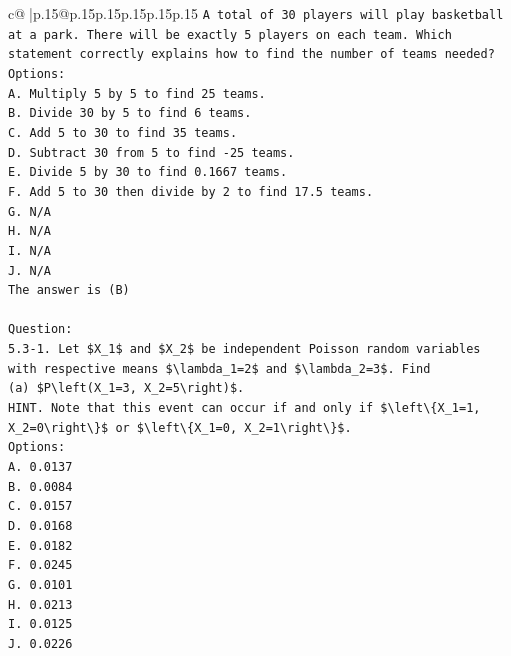 \documentclass{article}
\begin{document}
{\begin{supertabular}{c@{$\;$}|p{.15\linewidth}@{}p{.15\linewidth}p{.15\linewidth}p{.15\linewidth}p{.15\linewidth}p{.15\linewidth}}
{{{\texttt{A total of 30 players will play basketball at a park. There will be exactly 5 players on each team. Which statement correctly explains how to find the number of teams needed?} \\
\texttt{Options:} \\
\texttt{A. Multiply 5 by 5 to find 25 teams.} \\
\texttt{B. Divide 30 by 5 to find 6 teams.} \\
\texttt{C. Add 5 to 30 to find 35 teams.} \\
\texttt{D. Subtract 30 from 5 to find {-}25 teams.} \\
\texttt{E. Divide 5 by 30 to find 0.1667 teams.} \\
\texttt{F. Add 5 to 30 then divide by 2 to find 17.5 teams.} \\
\texttt{G. N/A} \\
\texttt{H. N/A} \\
\texttt{I. N/A} \\
\texttt{J. N/A} \\
\texttt{The answer is (B)} \\
\\ 
\texttt{Question:} \\
\texttt{5.3{-}1. Let \$X\_1\$ and \$X\_2\$ be independent Poisson random variables with respective means \$\textbackslash{}lambda\_1=2\$ and \$\textbackslash{}lambda\_2=3\$. Find} \\
\texttt{(a) \$P\textbackslash{}left(X\_1=3, X\_2=5\textbackslash{}right)\$.} \\
\texttt{HINT. Note that this event can occur if and only if \$\textbackslash{}left\textbackslash{}\{X\_1=1, X\_2=0\textbackslash{}right\textbackslash{}\}\$ or \$\textbackslash{}left\textbackslash{}\{X\_1=0, X\_2=1\textbackslash{}right\textbackslash{}\}\$.} \\
\texttt{Options:} \\
\texttt{A. 0.0137} \\
\texttt{B. 0.0084} \\
\texttt{C. 0.0157} \\
\texttt{D. 0.0168} \\
\texttt{E.  0.0182} \\
\texttt{F. 0.0245} \\
\texttt{G. 0.0101} \\
\texttt{H. 0.0213} \\
\texttt{I. 0.0125} \\
\texttt{J. 0.0226} \\
            }
        }
    }
     \\ \\


\end{supertabular}}
\end{document}
